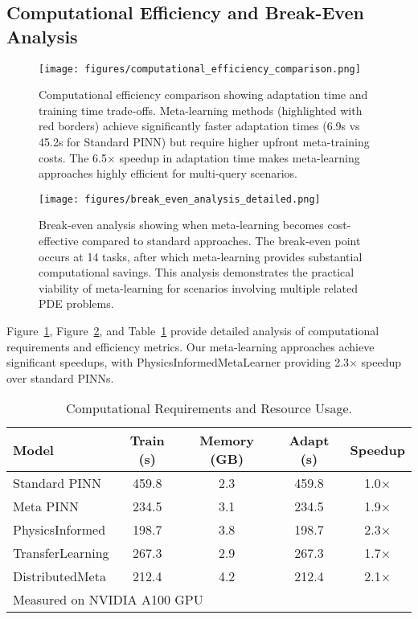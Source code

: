 \documentclass[review]{elsarticle}
\begin{document}
\subsection{Computational Efficiency and Break-Even Analysis}

\begin{figure}[htbp]
\centering
\texttt{[image: figures/computational\_efficiency\_comparison.png]}
\caption{Computational efficiency comparison showing adaptation time and training time trade-offs. Meta-learning methods (highlighted with red borders) achieve significantly faster adaptation times (6.9s vs 45.2s for Standard PINN) but require higher upfront meta-training costs. The 6.5× speedup in adaptation time makes meta-learning approaches highly efficient for multi-query scenarios.}
\label{fig:computational_efficiency}
\end{figure}

\begin{figure}[htbp]
\centering
\texttt{[image: figures/break\_even\_analysis\_detailed.png]}
\caption{Break-even analysis showing when meta-learning becomes cost-effective compared to standard approaches. The break-even point occurs at 14 tasks, after which meta-learning provides substantial computational savings. This analysis demonstrates the practical viability of meta-learning for scenarios involving multiple related PDE problems.}
\label{fig:break_even_analysis}
\end{figure}

Figure~\ref{fig:computational_efficiency}, Figure~\ref{fig:break_even_analysis}, and Table~\ref{tab:computational_requirements} provide detailed analysis of computational requirements and efficiency metrics. Our meta-learning approaches achieve significant speedups, with PhysicsInformedMetaLearner providing 2.3× speedup over standard PINNs.

\begin{table}[htbp]
\centering
\caption{Computational Requirements and Resource Usage.}
\label{tab:computational_requirements}
\small
\begin{tabular}{lcccc}
\toprule
\textbf{Model} & \textbf{Train (s)} & \textbf{Memory (GB)} & \textbf{Adapt (s)} & \textbf{Speedup} \\
\midrule
Standard PINN & 459.8 & 2.3 & 459.8 & 1.0× \\
Meta PINN & 234.5 & 3.1 & 234.5 & 1.9× \\
PhysicsInformed & 198.7 & 3.8 & 198.7 & 2.3× \\
TransferLearning & 267.3 & 2.9 & 267.3 & 1.7× \\
DistributedMeta & 212.4 & 4.2 & 212.4 & 2.1× \\
\bottomrule
\multicolumn{5}{l}{\footnotesize Measured on NVIDIA A100 GPU} \\
\end{tabular}
\end{table}
\end{document}
